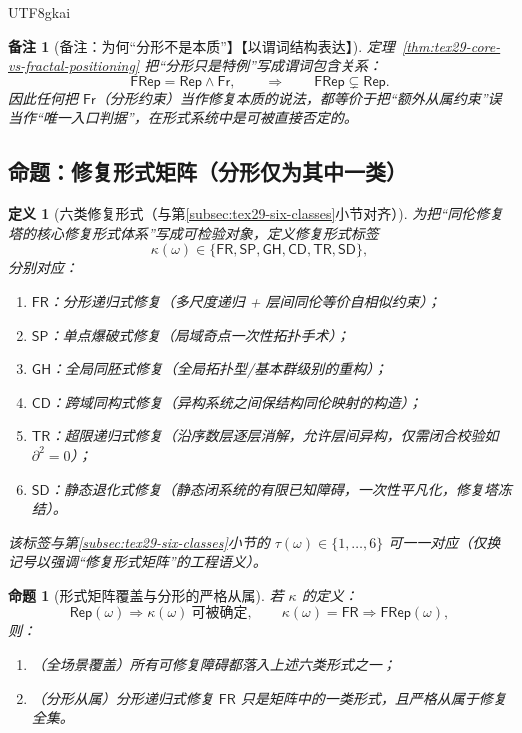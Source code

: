 \documentclass[12pt]{article}
\newtheorem{definition}{定义}[section]
\newtheorem{proposition}{命题}[section]
\newtheorem{remark}{备注}[section]
\newcommand{\KouJing}{\texorpdfstring{表述约定}{表述约定}}
\begin{document}
\begin{CJK*}{UTF8}{gkai}
\begin{remark}[备注：为何“分形不是本质”】【以谓词结构表达】]
定理~\ref{thm:tex29-core-vs-fractal-positioning} 把“分形只是特例”写成谓词包含关系：
\[
  \mathsf{FRep}=\mathsf{Rep}\wedge \mathsf{Fr},
  \qquad\Rightarrow\qquad
  \mathsf{FRep}\subsetneq \mathsf{Rep}.
\]
因此任何把 $\mathsf{Fr}$（分形约束）当作修复本质的说法，都等价于把“额外从属约束”误当作“唯一入口判据”，在形式系统中是可被直接否定的。
\end{remark}

\subsection{命题：修复形式矩阵（分形仅为其中一类）}
\label{subsec:tex29-repair-form-matrix}

\begin{definition}[六类修复形式（与第\ref{subsec:tex29-six-classes}小节对齐）]
为把“同伦修复塔的核心修复形式体系”写成可检验对象，定义修复形式标签
\[
  \kappa(\omega)\in\{\mathsf{FR},\mathsf{SP},\mathsf{GH},\mathsf{CD},\mathsf{TR},\mathsf{SD}\},
\]
分别对应：
\begin{enumerate}
  \item $\mathsf{FR}$：分形递归式修复（多尺度递归 + 层间同伦等价自相似约束）；
  \item $\mathsf{SP}$：单点爆破式修复（局域奇点一次性拓扑手术）；
  \item $\mathsf{GH}$：全局同胚式修复（全局拓扑型/基本群级别的重构）；
  \item $\mathsf{CD}$：跨域同构式修复（异构系统之间保结构同伦映射的构造）；
  \item $\mathsf{TR}$：超限递归式修复（沿序数层逐层消解，允许层间异构，仅需闭合校验如 $\partial^2=0$）；
  \item $\mathsf{SD}$：静态退化式修复（静态闭系统的有限已知障碍，一次性平凡化，修复塔冻结）。
\end{enumerate}
该标签与第\ref{subsec:tex29-six-classes}小节的 $\tau(\omega)\in\{1,\dots,6\}$ 可一一对应（仅换记号以强调“修复形式矩阵”的工程语义）。
\end{definition}

\begin{proposition}[形式矩阵覆盖与分形的严格从属]
\label{prop:tex29-repair-form-matrix}
若 $\kappa$ 的定义：
\[
  \mathsf{Rep}(\omega)\Rightarrow \kappa(\omega)\ \text{可被确定},
  \qquad
  \kappa(\omega)=\mathsf{FR}\Rightarrow \mathsf{FRep}(\omega),
\]
则：
\begin{enumerate}
  \item （全场景覆盖）所有可修复障碍都落入上述六类形式之一；
  \item （分形从属）分形递归式修复 $\mathsf{FR}$ 只是矩阵中的一类形式，且严格从属于修复全集。
\end{enumerate}
\end{proposition}


\end{CJK*}
\end{document}
